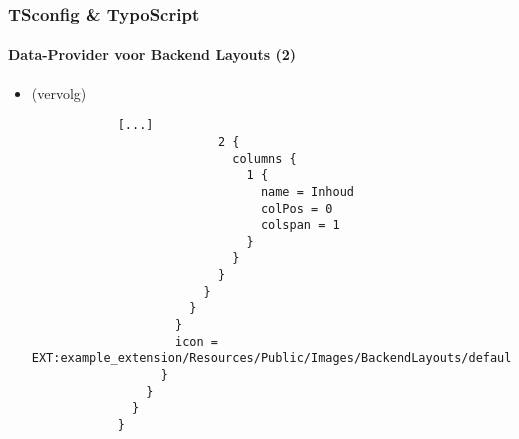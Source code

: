 \begin{frame}[fragile]
	\frametitle{TSconfig \& TypoScript}
	\framesubtitle{Data-Provider voor Backend Layouts (2)}

	\lstset{basicstyle=\tiny\ttfamily}

	\begin{itemize}
		\item \smaller(vervolg)\normalsize
		\begin{lstlisting}
			[...]
			              2 {
			                columns {
			                  1 {
			                    name = Inhoud
			                    colPos = 0
			                    colspan = 1
			                  }
			                }
			              }
			            }
			          }
			        }
			        icon = EXT:example_extension/Resources/Public/Images/BackendLayouts/default.gif
			      }
			    }
			  }
			}
		\end{lstlisting}
	\end{itemize}

\end{frame}


